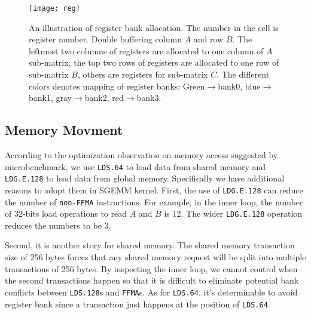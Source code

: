 \begin{figure}[htbp]
\begin{center}
\texttt{[image: reg]}
\caption{An illustration of register bank allocation. The number in the cell is register number. Double buffering column
    $A$ and row $B$. The leftmost two columns of registers are allocated to one column of $A$ sub-matrix, the
top two rows of registers are allocated to one row of sub-matrix $B$, others are registers for
sub-matrix $C$. The different colors denotes mapping of register banks: Green$\rightarrow$bank0, blue$\rightarrow$bank1, gray$\rightarrow$bank2, red$\rightarrow$bank3.}
\label{fig:reg}
\end{center}
\end{figure}


\subsection{Memory Movment}
According to the optimization observation on memory access suggested by microbenchmark, we use {\tt LDS.64} to load data from shared memory and {\tt LDG.E.128} to load data from global memory. Specifically we have additional reasons to adopt them in SGEMM kernel. First, the use of {\tt LDG.E.128} can reduce the number of {\tt non-FFMA} instructions. For example,  in the inner loop, the number of 32-bits load operations to read $A$ and $B$ is 12. The wider {\tt LDG.E.128} operation reduces the numbers to be 3.

Second, it is another story for shared memory. The shared memory transaction size of 256 bytes forces that any shared memory request will be split into multiple transactions of 256 bytes. By inspecting the inner loop, we cannot control when the second transactions happen so that it is difficult to eliminate potential bank conflicts between {\tt LDS.128}s and {\tt FFMA}s. As for {\tt LDS.64}, it's determinable to avoid register bank since a transaction just happens at the position of {\tt LDS.64}.

